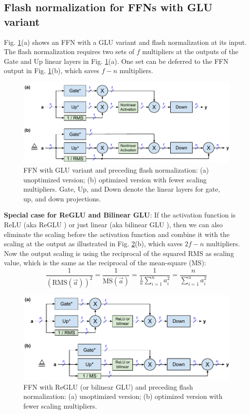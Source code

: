 \documentclass{article}
\def\rms{\text{RMS}(\vec{a})}         %
\def\f1n{\frac{1}{n}}                 %
\def\sas{\sum_{i=1}^n a_i^2}          %
\def\a{\vec{a}}                       %
\begin{document}
\subsection{Flash normalization for FFNs with GLU variant}
Fig. \ref{fig3}(a) shows an FFN with a GLU variant \citep{GLU} and flash normalization at its input. The flash normalization requires two sets of $f$ multipliers at the outputs of the Gate and Up linear layers in Fig. \ref{fig3}(a). One set can be deferred to the FFN output in Fig. \ref{fig3}(b), which saves $f - n$ multipliers.
\begin{figure}[h!] \centering
  \includegraphics[scale=0.9]{../doc/fig/flashNorm_fig3.pdf}
  \caption{FFN with GLU variant and preceding flash normalization: (a) unoptimized version; (b) optimized version with fewer scaling multipliers. Gate, Up, and Down denote the linear layers for gate, up, and down projections.}
\label{fig3} \end{figure}

\textbf{Special case for ReGLU and Bilinear GLU}: If the activation function is ReLU (aka ReGLU \citep{GLU}) or just linear (aka bilinear GLU \citep{GLU}), then we can also eliminate the scaling before the activation function and combine it with the scaling at the output as illustrated in Fig. \ref{fig4}(b), which saves $2f - n$ multipliers. Now the output scaling is using the reciprocal of the squared RMS as scaling value, which is the same as the reciprocal of the mean-square (MS):
\begin{equation*}
  \frac{1}{(\rms)^2} = \frac{1}{\text{MS}(\a)}
  = \frac{1}{\f1n \sas} = \frac{n}{\sas}
\end{equation*}

\begin{figure}[h!] \centering
  \includegraphics[scale=0.9]{../doc/fig/flashNorm_fig4.pdf}
  \caption{FFN with ReGLU (or bilinear GLU) and preceding flash normalization: (a) unoptimized version; (b) optimized version with fewer scaling multipliers.}
\label{fig4} \end{figure}
\end{document}
